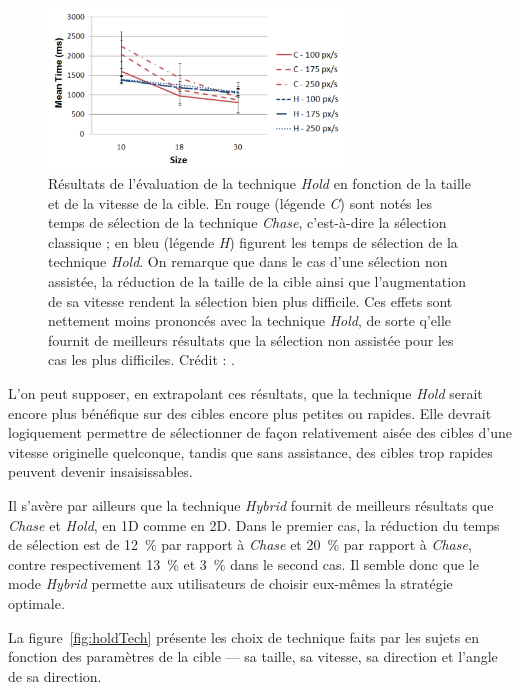 	\begin{figure}[!htb]
		\centering
		\includegraphics[width=0.70\textwidth]{figures/ch2/holdSFast}
		\caption[\emph{Hold} -- petites cibles rapides]{Résultats de l'évaluation de la technique \emph{Hold} en fonction de la taille et de la vitesse de la cible. En rouge (légende \emph{C}) sont notés les temps de sélection de la technique \emph{Chase}, c'est-à-dire la sélection classique ; en bleu (légende \emph{H}) figurent les temps de sélection de la technique \emph{Hold}. On remarque que dans le cas d'une sélection non assistée, la réduction de la taille de la cible ainsi que l'augmentation de sa vitesse rendent la sélection bien plus difficile. Ces effets sont nettement moins prononcés avec la technique \emph{Hold}, de sorte q'elle fournit de meilleurs résultats que la sélection non assistée pour les cas les plus difficiles. Crédit : \cite{hajri2011moving}.}
		\label{fig:holdSFast}
	\end{figure}
	
	L'on peut supposer, en extrapolant ces résultats, que la technique \emph{Hold} serait encore plus bénéfique sur des cibles encore plus petites ou rapides. Elle devrait logiquement permettre de sélectionner de façon relativement aisée des cibles d'une vitesse originelle quelconque, tandis que sans assistance, des cibles trop rapides peuvent devenir insaisissables.
	
	Il s'avère par ailleurs que la technique \emph{Hybrid} fournit de meilleurs résultats que \emph{Chase} et \emph{Hold}, en 1D comme en 2D. Dans le premier cas, la réduction du temps de sélection est de 12~\%{} par rapport à \emph{Chase} et 20~\%{} par rapport à \emph{Chase}, contre respectivement 13~\%{} et 3~\%{} dans le second cas. Il semble donc que le mode \emph{Hybrid} permette aux utilisateurs de choisir eux-mêmes la stratégie optimale.
	
	La figure~\ref{fig:holdTech} présente les choix de technique faits par les sujets en fonction des paramètres de la cible --- sa taille, sa vitesse, sa direction et l'angle de sa direction.
	
